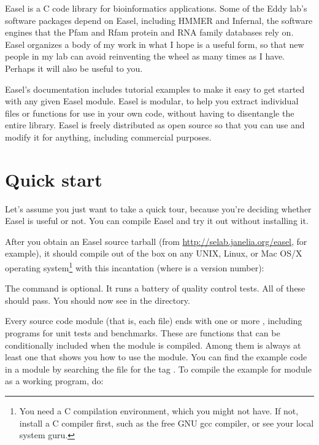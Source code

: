 



Easel is a C code library for bioinformatics applications.  Some of
the Eddy lab's software packages depend on Easel, including HMMER and
Infernal, the software engines that the Pfam and Rfam protein and RNA
family databases rely on. Easel organizes a body of my work in what I
hope is a useful form, so that new people in my lab can avoid
reinventing the wheel as many times as I have. Perhaps it will also be
useful to you.

Easel's documentation includes tutorial examples to make it easy to
get started with any given Easel module. Easel is modular, to help you
extract individual files or functions for use in your own code,
without having to disentangle the entire library. Easel is freely
distributed as open source so that you can use and modify it for
anything, including commercial purposes.

\section{Quick start}

Let's assume you just want to take a quick tour, because you're
deciding whether Easel is useful or not. You can compile Easel and try
it out without installing it. 

After you obtain an Easel source tarball (from
\url{http://selab.janelia.org/easel}, for example), it should compile
out of the box on any UNIX, Linux, or Mac OS/X operating
system\footnote{You need a C compilation environment, which you might
not have. If not, install a C compiler first, such as the free GNU gcc
compiler, or see your local system guru.} with this incantation
(where  is a version number):

\begin{cchunk}
\end{cchunk}

The  command is optional. It runs a battery of
quality control tests. All of these should pass. You should now see
 in the directory.

Every source code module (that is, each  file) ends with one
or more , including programs for unit tests
and benchmarks. These are  functions that can be
conditionally included when the module is compiled. Among them is
always at least one  that shows you how to use
the module. You can find the example code in a module  by
searching the  file for the tag
. To compile the example for module
 as a working program, do:

